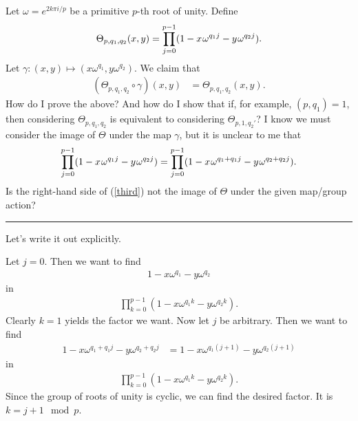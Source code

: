 \documentclass[12pt,reqno]{amsart}
\newcommand{\bee}{\begin{equation}\begin{aligned}}
\newcommand{\eee}{\end{aligned}\end{equation}}
\renewcommand{\'}{\hspace{0.5mm}'}		%
\newcommand{\hrul}{\vspace{3mm}\hrule\vspace{3mm}}
\begin{document}
Let $\omega = e^{2k\pi i/p}$ be a primitive
$p$-th root of unity. Define
\bee
	\Theta_{p,q_1,q_2}(x,y) = \prod_{j = 0}^{p - 1} 
	(1 - x \hspace{0.25mm} \omega^{q_1j} 
	- y \hspace{0.25mm} \omega^{q_2j}). 
\eee
Let $\gamma: (x,y) \mapsto (x\omega^{q_1},y\omega^{q_2})$. 
We claim that 
\bee
	(\Theta_{p,q_1,q_2} \circ \gamma)(x,y) 
	&=
		\Theta_{p,q_1,q_2}(x,y). 
\eee
How do I prove the above? And how do I show that
if, for example, $(p,q_1) = 1$, then 
considering $\Theta_{p,q_1,q_2}$ is equivalent to considering
$\Theta_{p,1,q_2'}$? I know we must consider the image of
$\Theta$ under the map $\gamma$, but it is unclear to me that
\bee\label{third}
	\prod_{j = 0}^{p - 1} 
	(1 - x \hspace{0.25mm} \omega^{q_1j} 
	- y \hspace{0.25mm} \omega^{q_2j})
	= 
	\prod_{j = 0}^{p - 1} 
	(1 - x \hspace{0.25mm} \omega^{q_1 + q_1j} 
	- y \hspace{0.25mm} \omega^{q_2 + q_2j}). 
\eee
Is the right-hand side of (\ref{third}) not the image of $\Theta$
under the given map/group action?

\hrul 

Let's write it out explicitly. 

Let $j = 0$. Then we want to find 
\bee
	1 - x\omega^{q_1} - y\omega^{q_2}
\eee
in 
\bee
	\prod_{k = 0}^{p - 1}
	(1 - x \omega^{q_1k} 
	- y \omega^{q_2k}). 
\eee
Clearly $k = 1$ yields the factor we want.
Now let $j$ be arbitrary. Then we want to find 
\bee
	1 - x\omega^{q_1 + q_1j} - y\omega^{q_2 + q_2j}
	&=
		1 - x\omega^{q_1(j + 1)} - y\omega^{q_2(j + 1)}
\eee
in
\bee
	\prod_{k = 0}^{p - 1}
	(1 - x \omega^{q_1k} 
	- y \omega^{q_2k}). 
\eee
Since the group of roots of unity is cyclic, we can find
the desired factor. It is $k = j + 1 \mod p$. 
\end{document}

